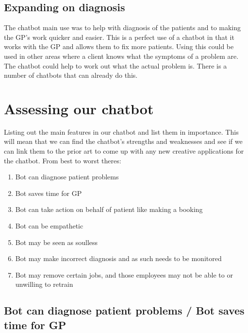\documentclass{article}
\begin{document}
\subsection{Expanding on diagnosis}
The chatbot main use was to help with diagnosis of the patients and to making the GP's work quicker and easier. This is a perfect use of a chatbot in that it works with the GP and allows them to fix more patients.
Using this could be used in other areas where a client knows what the symptoms of a problem are. The chatbot could help to work out what the actual problem is. There is a number of chatbots that can already do this. \cite{gyan}\cite{devops}

\section{Assessing our chatbot}
Listing out the main features in our chatbot and list them in importance. This will mean that we can find the chatbot's strengths and weaknesses and see if we can link them to the prior art to come up with any new creative applications for the chatbot.
\smallbreak
From best to worst theres:
\begin{enumerate}
    \item Bot can diagnose patient problems
    \item Bot saves time for GP
    \item Bot can take action on behalf of patient like making a booking
    \item Bot can be empathetic
    \item Bot may be seen as soulless
    \item Bot may make incorrect diagnosis and as such needs to be monitored
    \item Bot may remove certain jobs, and those employees may not be able to or unwilling to retrain
\end{enumerate}

\subsection{Bot can diagnose patient problems / Bot saves time for GP} \label{diagnose}
\end{document}
